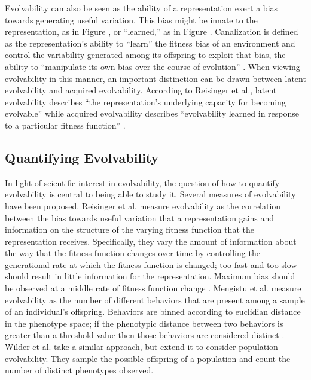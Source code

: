 Evolvability can also be seen as the ability of a representation exert a bias towards generating useful variation.\mindmapmark{\evolvabilityusefulvariation} This bias might be innate to the representation, as in Figure , or ``learned,'' as in Figure .  Canalization is defined as the representation's ability to ``learn'' the fitness bias of an environment and control the variability generated among its offspring to exploit that bias, the ability to ``manipulate its own bias over the course of evolution'' \cite{Reisinger2007AcquiringRepresentations}. When viewing evolvability in this manner, an important distinction can be drawn between latent evolvability and acquired evolvability. According to Reisinger et al., latent evolvability describes ``the representation’s underlying capacity for becoming evolvable'' while acquired evolvability describes ``evolvability learned in response to a particular fitness function'' \cite{Reisinger2005TowardsEvolvability}.

\subsection{Quantifying Evolvability}

In light of scientific interest in evolvability, the question of how to quantify evolvability is central to being able to study it. Several measures of evolvability have been proposed. Reisinger et al. measure evolvability as the correlation between the bias towards useful variation that a representation gains and information on the structure of the varying fitness function that the representation receives. Specifically, they vary the amount of information about the way that the fitness function changes over time by controlling the generational rate at which the fitness function is changed; too fast and too slow should result in little information for the representation. Maximum bias should be observed at a middle rate of fitness function change \cite{Reisinger2005TowardsEvolvability}. Mengistu et al. measure evolvability as the number of different behaviors that are present among a sample of an individual's offspring. Behaviors are binned according to euclidian distance in the phenotype space; if the phenotypic distance between two behaviors is greater than a threshold value then those behaviors are considered distinct \cite{Mengistu2016EvolvabilityIt}. Wilder et al. take a similar approach, but extend it to consider population evolvability. They sample the possible offspring of a population and count the number of distinct phenotypes observed.

